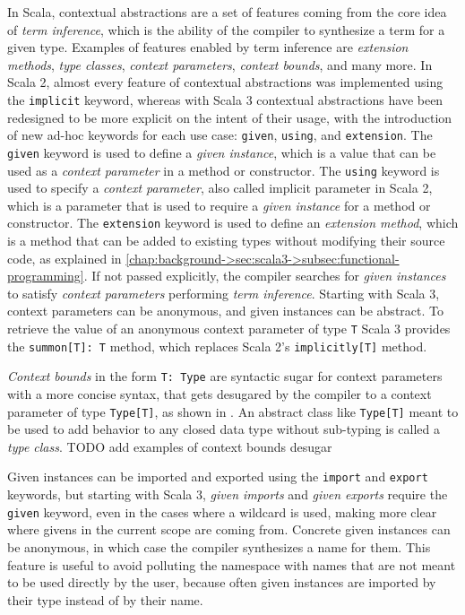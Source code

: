 In Scala, contextual abstractions are a set of features coming from the core idea of \textit{term inference}, which is the ability of the compiler to synthesize a  term for a given type.
%
Examples of features enabled by term inference are \textit{extension methods}, \textit{type classes}, \textit{context parameters}, \textit{context bounds}, and many more.
%
In Scala 2, almost every feature of contextual abstractions was implemented using the \texttt{implicit} keyword, whereas with Scala 3 contextual abstractions have been redesigned to be more explicit on the intent of their usage, with the introduction of new ad-hoc keywords for each use case: \texttt{given}, \texttt{using}, and \texttt{extension}.
%
The \texttt{given} keyword is used to define a \textit{given instance}, which is a value that can be used as a \textit{context parameter} in a method or constructor.
%
The \texttt{using} keyword is used to specify a \textit{context parameter}, also called implicit parameter in Scala 2, which is a parameter that is used to require a \textit{given instance} for a method or constructor.
%
The \texttt{extension} keyword is used to define an \textit{extension method}, which is a method that can be added to existing types without modifying their source code, as explained in \cref{chap:background->sec:scala3->subsec:functional-programming}.
%
If not passed explicitly, the compiler searches for \textit{given instances} to satisfy \textit{context parameters} performing \textit{term inference}.
%
Starting with Scala 3, context parameters can be anonymous, and given instances can be abstract.
%
To retrieve the value of an anonymous context parameter of type \texttt{T} Scala 3 provides the \texttt{summon[T]: T} method, which replaces Scala 2's \texttt{implicitly[T]} method.

\textit{Context bounds} in the form \texttt{T: Type} are syntactic sugar for context parameters with a more concise syntax, that gets desugared by the compiler to a context parameter of type \texttt{Type[T]}, as shown in .
%
An abstract class like \texttt{Type[T]} meant to be used to add behavior to any closed data type without sub-typing is called a \textit{type class}.
TODO add examples of context bounds desugar

Given instances can be imported and exported using the \texttt{import} and \texttt{export} keywords, but starting with Scala 3, \textit{given imports} and \textit{given exports} require the \texttt{given} keyword, even in the cases where a wildcard is used, making more clear where givens in the current scope are coming from.
%
Concrete given instances can be anonymous, in which case the compiler synthesizes a name for them.
%
This feature is useful to avoid polluting the namespace with names that are not meant to be used directly by the user, because often given instances are imported by their type instead of by their name.

